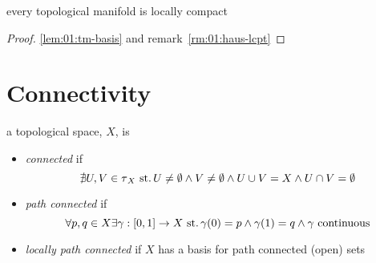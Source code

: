 \begin{cor}
  every topological manifold is locally compact
\end{cor}
\begin{proof}
  \ref{lem:01:tm-basis} and remark~\ref{rm:01:haus-lcpt}
\end{proof}

\section{Connectivity}
\begin{defn}
  a topological space, $X$, is
  \begin{itemize}
  \item
    \emph{connected} if
    \[
    \nexists U,V\in\operatorname{\tau}_X \operatorname{\,st.}
    U\neq\emptyset \land V\neq\emptyset\land
    U\cup V=X\land U\cap V=\emptyset
    \]
  \item
    \emph{path connected} if
    \[
    \forall p,q\in X
    \exists \gamma: [0,1]\rightarrow X \operatorname{\,st.}
    \gamma(0) = p \land \gamma(1) = q \land
    \gamma \text{ continuous}
    \]
  \item
    \emph{locally path connected} if
    $X$ has a basis for path connected (open) sets
  \end{itemize}
\end{defn}

